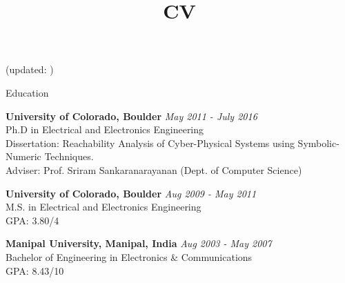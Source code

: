 \documentclass{resume} %
\title{CV}
\begin{document}
\begin{center}
\vspace{-.2cm}
\scriptsize{({updated: \filemodprintdate{\jobname}})}
\vspace{.5cm}
\end{center}



\begin{rSection}{Education}

{\bf University of Colorado, Boulder} \hfill {\em May 2011 - July 2016} \\ 
Ph.D in Electrical and Electronics Engineering\\
Dissertation: Reachability Analysis of Cyber-Physical Systems using Symbolic-Numeric Techniques.\\
Adviser: Prof. Sriram Sankaranarayanan (Dept. of Computer Science)

{\bf University of Colorado, Boulder} \hfill {\em Aug 2009 - May 2011} \\ 
M.S. in Electrical and Electronics Engineering \\
GPA: 3.80/4

{\bf Manipal University, Manipal, India} \hfill {\em Aug 2003 - May 2007} \\ 
Bachelor of Engineering in Electronics \& Communications \\
GPA: 8.43/10

\end{rSection}
\end{document}
